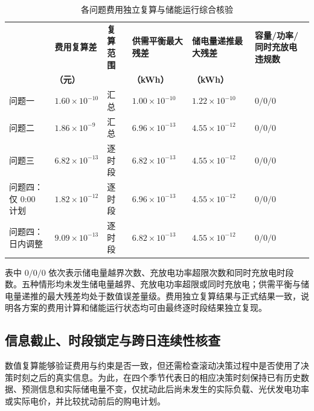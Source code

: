 \documentclass[12pt,a4paper]{ctexart}
\renewcommand{\textbf}[1]{{\CJKfamily{heiti}\bfseries #1}}
\begin{document}
\begin{table}[htbp]
\centering
\caption{各问题费用独立复算与储能运行综合核验}
\label{tab:independent_validation_all}
\small
\setlength{\tabcolsep}{2pt}
\renewcommand{\arraystretch}{1.20}
\begin{tabular}{>{\raggedright\arraybackslash}p{2.75cm} >{\centering\arraybackslash}p{2.35cm} >{\centering\arraybackslash}p{1.35cm} >{\centering\arraybackslash}p{2.55cm} >{\centering\arraybackslash}p{2.55cm} >{\centering\arraybackslash}p{3.35cm}}
\toprule
\textbf{情形} & \textbf{费用复算差} & \textbf{复算范围} & \textbf{供需平衡最大残差} & \textbf{储电量递推最大残差} & \textbf{容量/功率/同时充放电违规数} \\
& \textbf{（元）} & & \textbf{（kWh）} & \textbf{（kWh）} & \\
\midrule
问题一 & $1.60\times10^{-10}$ & 汇总 & $1.00\times10^{-10}$ & $1.22\times10^{-10}$ & $0/0/0$ \\
问题二 & $1.86\times10^{-9}$ & 汇总 & $6.96\times10^{-13}$ & $4.55\times10^{-12}$ & $0/0/0$ \\
问题三 & $6.82\times10^{-13}$ & 逐时段 & $6.82\times10^{-13}$ & $4.55\times10^{-12}$ & $0/0/0$ \\
问题四：仅 0:00 计划 & $1.82\times10^{-12}$ & 逐时段 & $6.96\times10^{-13}$ & $4.55\times10^{-12}$ & $0/0/0$ \\
问题四：日内调整 & $9.09\times10^{-13}$ & 逐时段 & $6.82\times10^{-13}$ & $4.55\times10^{-12}$ & $0/0/0$ \\
\bottomrule
\end{tabular}
\end{table}

表中 $0/0/0$ 依次表示储电量越界次数、充放电功率超限次数和同时充放电时段数。五种情形均未发生储电量越界、充放电功率超限或同时充放电；供需平衡与储电量递推的最大残差均处于数值误差量级。费用独立复算结果与正式结果一致，说明各方案的费用计算和储能运行状态均可由最终逐时段结果独立复现。

\subsection{信息截止、时段锁定与跨日连续性核查}
数值复算能够验证费用与约束是否一致，但还需检查滚动决策过程中是否使用了决策时刻之后的真实信息。为此，在四个季节代表日的相应决策时刻保持已有历史数据、预测信息和实际储电量不变，仅扰动此后尚未发生的实际负载、光伏发电功率或实际电价，并比较扰动前后的购电计划。
\end{document}
